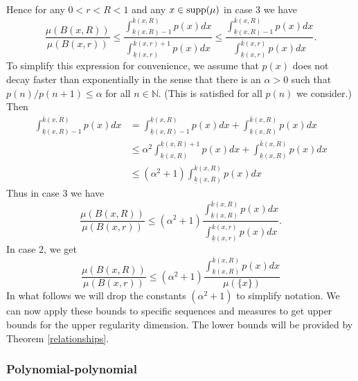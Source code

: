 \documentclass[12pt]{amsart}
\numberwithin{equation}{section}
\renewcommand{\le}{\leqslant}
\begin{document}
Hence for any $0<r<R<1$ and any $x\in  \textup{supp}(\mu)$ in case 3 we have
\[
\frac{\mu(B(x,R))}{\mu(B(x,r))} \le \frac{\int_{\underline{k}(x,R)-1}^{\overline{k}(x,R)} p(x)dx}{\int_{\underline{k}(x,r)}^{\overline{k}(x,r)+1} p(x)dx} \le \frac{\int_{\underline{k}(x,R)-1}^{\overline{k}(x,R)} p(x)dx}{\int_{\underline{k}(x,r)}^{\overline{k}(x,r)} p(x)dx}.
\]
To simplify this expression for convenience, we assume that $p(x)$ does not decay faster than exponentially in the sense that there is an $\alpha>0$ such that $p(n)/p(n+1) \le \alpha$ for all $n\in \mathbb{N}$. (This is satisfied for all $p(n)$ we consider.) Then
\begin{align*}
\int_{\underline{k}(x,R)-1}^{\overline{k}(x,R)} p(x)dx &=\int_{\underline{k}(x,R)-1}^{\underline{k}(x,R)} p(x)dx + \int_{\underline{k}(x,R)}^{\overline{k}(x,R)} p(x)dx \\
&\le \alpha^2\int_{\underline{k}(x,R)}^{\underline{k}(x,R)+1} p(x)dx + \int_{\underline{k}(x,R)}^{\overline{k}(x,R)} p(x)dx \\
&\le (\alpha^2+1) \int_{\underline{k}(x,R)}^{\overline{k}(x,R)} p(x)dx 
\end{align*}
Thus in case 3 we have 
\[
\frac{\mu(B(x,R))}{\mu(B(x,r))} \le (\alpha^2+1) \frac{\int_{\underline{k}(x,R)}^{\overline{k}(x,R)} p(x)dx}{\int_{\underline{k}(x,r)}^{\overline{k}(x,r)} p(x)dx}.
\]
In case 2, we get 
\[
\frac{\mu(B(x,R))}{\mu(B(x,r))} \le (\alpha^2+1)  \frac{\int_{\underline{k}(x,R)}^{\overline{k}(x,R)} p(x)dx}{\mu(\{x\})}
\]
In what follows we will drop the constants $(\alpha^2+1) $ to simplify notation.  We can now apply these bounds to specific sequences and measures to get upper bounds for the upper regularity dimension.  The lower bounds will be provided by Theorem \ref{relationships}.

\subsubsection{Polynomial-polynomial}
\end{document}
